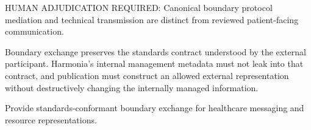 HUMAN ADJUDICATION REQUIRED: Canonical boundary protocol mediation and technical transmission are distinct from reviewed patient-facing communication.



Boundary exchange preserves the standards contract understood by the external participant. Harmonia's internal management metadata must not leak into that contract, and publication must construct an allowed external representation without destructively changing the internally managed information.



Provide standards-conformant boundary exchange for healthcare messaging and resource representations.



